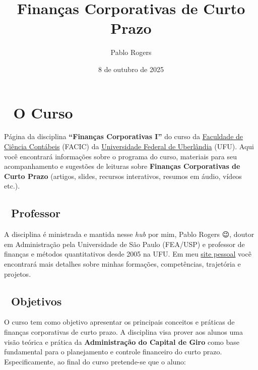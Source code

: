 \documentclass[
  a4paper,
]{book}
\title{Finanças Corporativas de Curto Prazo}
\author{Pablo Rogers}
\date{8 de outubro de 2025}
\renewcommand*\contentsname{Índice}
\newcommand\contentsname{Índice}
\begin{document}
\frontmatter
\maketitle

\renewcommand*\contentsname{Índice}
{
\hypersetup{linkcolor=}
\setcounter{tocdepth}{2}
\tableofcontents
}

\mainmatter
{}

\chapter*{🏢 O Curso}\label{sec-home}


Página da disciplina \textbf{``Finanças Corporativas I''} do curso da
\href{https://www.facic.ufu.br/}{Faculdade de Ciência Contábeis} (FACIC)
da \href{https://ufu.br/}{Universidade Federal de Uberlândia} (UFU).
Aqui você encontrará informações sobre o programa do curso, materiais
para seu acompanhamento e sugestões de leituras sobre \textbf{Finanças
Corporativas de Curto Prazo} (artigos, slides, recursos interativos,
resumos em áudio, vídeos etc.).

\section*{🧠 Professor}\label{sec-instrutor}


A disciplina é ministrada e mantida nesse \emph{hub} por mim, Pablo
Rogers 😉, doutor em Administração pela Universidade de São Paulo
(FEA/USP) e professor de finanças e métodos quantitativos desde 2005 na
UFU. Em meu \href{https://phdpablo.com/}{site pessoal} você encontrará
mais detalhes sobre minhas formações, competências, trajetória e
projetos.

\section*{🎯 Objetivos}\label{sec-about}


O curso tem como objetivo apresentar os principais conceitos e práticas
de finanças corporativas de curto prazo. A disciplina visa prover aos
alunos uma visão teórica e prática da \textbf{Administração do Capital
de Giro} como base fundamental para o planejamento e controle financeiro
do curto prazo. Especificamente, ao final do curso pretende-se que o
aluno:
\end{document}
